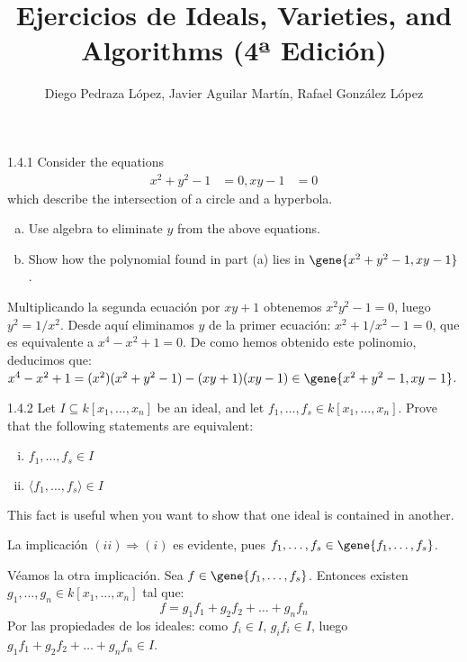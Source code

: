 \documentclass[twoside]{article}
\begin{document}
\title{Ejercicios de Ideals, Varieties, and Algorithms (4ª Edición)}
\author{Diego Pedraza López, Javier Aguilar Martín, Rafael González López}
\maketitle

\begin{ejercicio}{1.4.1}
Consider the equations
\begin{align*}
x^2 + y^2 -1 & = 0,
xy - 1 & = 0
\end{align*}
which describe the intersection of a circle and a hyperbola.
\begin{enumerate}[a.]
\item Use algebra to eliminate $y$ from the above equations.
\item Show how the polynomial found in part (a) lies in $\gene{x^2+y^2-1, xy-1}$.
\end{enumerate}
\end{ejercicio}

\begin{solucion}
Multiplicando la segunda ecuación por $xy+1$ obtenemos $x^2y^2-1=0$, luego $y^2 = 1/x^2$.
Desde aquí eliminamos $y$ de la primer ecuación: $x^2+1/x^2-1=0$, que es equivalente a $x^4-x^2+1=0$.
De como hemos obtenido este polinomio, deducimos que: $x^4-x^2+1 = (x^2)(x^2+y^2-1)-(xy+1)(xy-1) \in \gene{x^2+y^2-1, xy-1}$.
\end{solucion}

\newpage

\begin{ejercicio}{1.4.2}
Let $I \subseteq k[x_1,\dots,x_n]$ be an ideal, and let $f_1,\dots,f_s \in k[x_1,\dots,x_n]$. Prove that the following statements are equivalent:
\begin{enumerate}[(i)]
\item $f_1,\dots,f_s \in I$
\item $\langle f_1,\dots,f_s\rangle \in I$
\end{enumerate}
This fact is useful when you want to show that one ideal is contained in another.
\end{ejercicio}

\begin{solucion}
La implicación $(ii)\Rightarrow(i)$ es evidente, pues $f_1,\dots,f_s \in \gene{f_1,\dots, f_s}$.

Véamos la otra implicación.
Sea $f \in \gene{f_1,\dots,f_s}$.
Entonces existen $g_1,\dots,g_n \in k[x_1,\dots,x_n]$ tal que:
\[ f = g_1 f_1 + g_2 f_2 + \dots + g_n f_n \]
Por las propiedades de los ideales: como $f_i \in I$, $g_i f_i \in I$, luego $g_1 f_1 + g_2 f_2 + \dots + g_n f_n \in I$.
\end{solucion}
\end{document}
